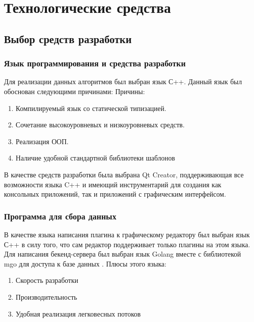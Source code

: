 \chapter{Технологические средства}

\section{Выбор средств разработки}
\subsection{Язык программирования и средства разработки}
Для реализации данных алгоритмов был выбран язык  С++. Данный язык был обоснован следующими причинами:
Причины:
\begin{enumerate}
	\item Компилируемый язык со статической типизацией. 
	\item Сочетание высокоуровневых и низкоуровневых средств.
	\item Реализация ООП.
	\item Наличие удобной стандартной библиотеки шаблонов
\end{enumerate}
В качестве средств разработки была выбрана Qt Creator,
поддерживающая все возможности языка C++ и имеющий инструментарий
для создания как консольных приложений, так и приложений с графическим
интерфейсом.
\subsection{Программа для сбора данных}
В качестве языка написания плагина к графическому редактору был выбран язык С++ в силу того, что сам редактор поддерживает только плагины на этом языка. 
Для написания бекенд-сервера был выбран язык Golang вместе с библиотекой  mgo для доступа к базе данных . Плюсы этого языка:
\begin{enumerate}

\item Скорость разработки	 	

\item Производительность

\item Удобная реализация легковесных потоков 


\end{enumerate}
